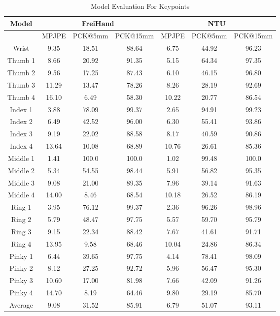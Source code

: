 \begin{table}[ht!]
\centering
\begin{tabular*}{\textwidth}{c @{\extracolsep{\fill}} cccccc}
\toprule
Model &  \multicolumn{3}{c}{FreiHand} & \multicolumn{3}{c}{NTU} \\[0.5ex] 
\midrule
{} & MPJPE & PCK@5mm & PCK@15mm & MPJPE & PCK@5mm & PCK@15mm \\ 
\hline
Wrist & 9.35 & 18.51 & 88.64 & 6.75 & 44.92 & 96.23 \\ 
Thumb 1 & 8.66 & 20.92 & 91.35 & 5.15 & 64.34 & 97.35 \\
Thumb 2 & 9.56 & 17.25 & 87.43 & 6.10 & 46.15 & 96.80 \\
Thumb 3 & 11.29 & 13.47 & 78.26 & 8.26 & 28.19 & 92.69 \\
Thumb 4 & 16.10 & 6.49 & 58.30 & 10.22 & 20.77 & 86.54 \\ 
Index 1 & 3.88 & 78.09 & 99.37 & 2.65 & 94.91 & 99.23 \\
Index 2 & 6.49 & 42.52 & 96.00 & 6.30 & 55.41 & 93.86 \\
Index 3 & 9.19 & 22.02 & 88.58 & 8.17 & 40.59 & 90.86 \\
Index 4 & 13.64 & 10.08 & 68.89 & 10.76 & 26.61 & 85.36 \\ 
Middle 1 & 1.41 & 100.0 & 100.0 & 1.02 & 99.48 & 100.0 \\
Middle 2 & 5.34 & 54.55 & 98.44 & 5.91 & 56.82 & 95.35 \\
Middle 3 & 9.08 & 21.00 & 89.35 & 7.96 & 39.14 & 91.63 \\
Middle 4 & 14.00 & 8.46 & 68.54 & 10.18 & 26.52 & 86.19 \\ 
Ring 1 & 3.95 & 76.12 & 99.37 & 2.36 & 96.26 & 98.96 \\
Ring 2 & 5.79 & 48.47 & 97.75 & 5.57 & 59.70 & 95.79 \\
Ring 3 & 9.15 & 22.34 & 88.42 & 7.67 & 41.61 & 91.71 \\
Ring 4 & 13.95 & 9.58 & 68.46 & 10.04 & 24.86 & 86.34 \\
Pinky 1 & 6.44 & 39.65 & 97.75 & 4.14 & 78.41 & 98.09 \\
Pinky 2 & 8.12 & 27.25 & 92.72 & 5.96 & 56.47 & 95.30 \\
Pinky 3 & 10.60 & 17.00 & 81.98 & 7.66 & 42.09 & 91.26 \\
Pinky 4 & 14.70 & 8.19 & 64.46 & 9.80 & 29.19 & 85.70 \\
Average & 9.08 & 31.52 & 85.91 & 6.79 & 51.07 & 93.11 \\
[1ex] 
\hline
\end{tabular*}
\caption{Model Evaluation For Keypoints}
\label{table:model_evaluation_keypoints}
\end{table}

